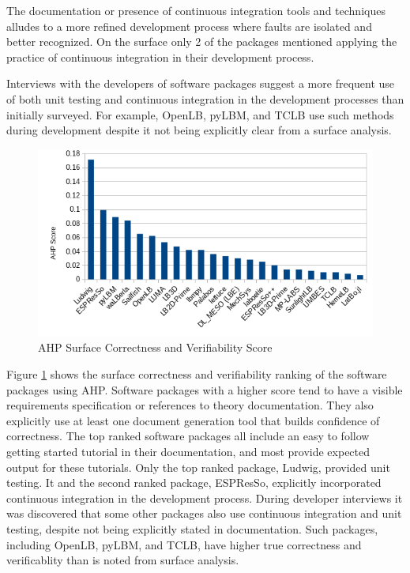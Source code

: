 \documentclass[12pt, notitlepage]{article}
\begin{document}
The documentation or presence of continuous integration tools and techniques alludes to a more refined development process where faults are isolated and better recognized. On the surface only 2 of the packages mentioned applying the practice of continuous integration in their development process. 

Interviews with the developers of software packages suggest a more frequent use of both unit testing and continuous integration in the development processes than initially surveyed. For example, OpenLB, pyLBM, and TCLB use such methods during development despite it not being explicitly clear from a surface analysis. 

\begin{figure}[h!]
	\begin{center}
		\includegraphics[width=1.0\textwidth]{correctnessverifiability_chart}
		\caption{AHP Surface Correctness and Verifiability Score}
		\label{Fig_CorrectnessVerifiability}
	\end{center}
\end{figure}

Figure \ref{Fig_CorrectnessVerifiability} shows the surface correctness and verifiability ranking of the software packages using AHP. Software packages with a higher score tend to have a visible requirements specification or references to theory documentation. They also explicitly use at least one document generation tool that builds confidence of correctness. The top ranked software packages all include an easy to follow getting started tutorial in their documentation, and most provide expected output for these tutorials. Only the top ranked package, Ludwig, provided unit testing. It and the second ranked package, ESPResSo, explicitly incorporated continuous integration in the development process. During developer interviews it was discovered that some other packages also use continuous integration and unit testing, despite not being explicitly stated in documentation. Such packages, including OpenLB, pyLBM, and TCLB, have higher true correctness and verificablity than is noted from surface analysis.
\end{document}

